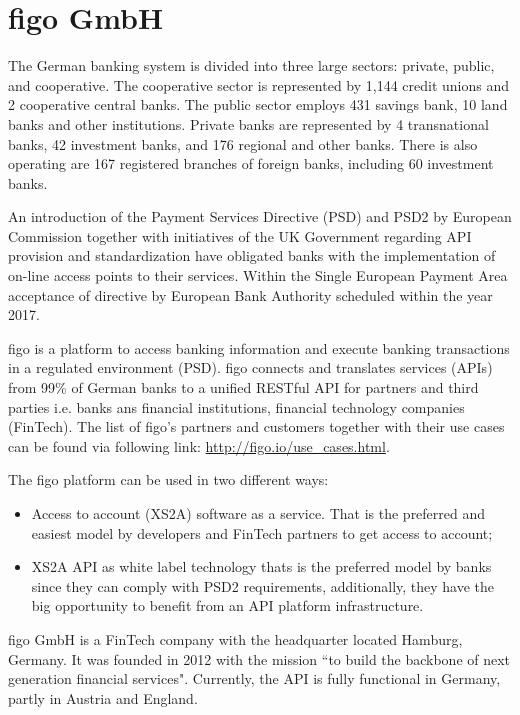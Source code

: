 \chapter{figo GmbH}
\label{chaper:figo}
The German banking system is divided into three large sectors: private, public, and cooperative. The cooperative sector is represented by 1,144 credit unions and 2 cooperative central banks. The public sector employs 431 savings bank, 10 land banks and other institutions. Private banks are represented by 4 transnational banks, 42 investment banks, and 176 regional and other banks. There is also operating are 167 registered branches of foreign banks, including 60 investment banks\cite{listOfBanks}.   

An introduction of the Payment Services Directive (PSD) and PSD2 by European Commission together with initiatives of the UK Government regarding API provision and standardization have obligated banks with the implementation of on-line access points to their services\cite{LarsAPI}\cite{TimAPI}\cite{DaveAPI}. Within the Single European Payment Area acceptance of directive by European Bank Authority scheduled within the year 2017\cite{PSD2}.



figo is a platform to access banking information and execute banking transactions in a regulated environment (PSD).  figo connects and translates services (APIs) from 99\% of German banks to a unified RESTful API for partners and third parties i.e. banks ans financial institutions, financial technology companies (FinTech)\cite{figoAngel}\cite{figoCB}\cite{figoFAQWhat}\cite{figoFAQVision}\cite{figoFAQPartners}.
The list of figo's partners and customers  together with their use cases can be found via following link: \url{http://figo.io/use\_cases.html}.

The figo platform can be used in two different ways: 
\begin{itemize}
	\item Access to account (XS2A) software as a service. That is the preferred and easiest model by developers and FinTech partners to get access to account;
	\item XS2A API as white label technology  thats is the preferred model by banks since they can comply with PSD2 requirements, additionally, they have the big opportunity to benefit from an API platform infrastructure. 
\end{itemize}

figo GmbH is a FinTech company with the headquarter located Hamburg, Germany. It was founded in 2012  with the mission “to build the backbone of next generation financial services"\cite{figoFAQVision}.  Currently, the API is fully functional in Germany, partly in Austria and England\cite{figoAngel}\cite{figoCB}.


